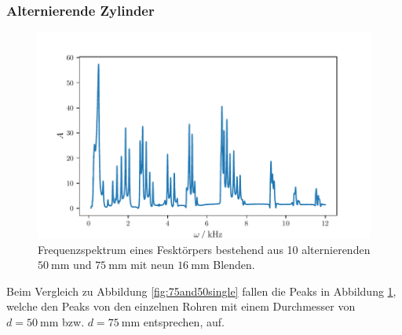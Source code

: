 \subsubsection{Alternierende Zylinder}
\begin{figure}
    \centering
    \includegraphics{build/5075.pdf}
    \caption{Frequenzspektrum eines Fesktörpers bestehend aus 10 alternierenden $\qty{50}{\milli\meter}$ und $\qty{75}{\milli\meter}$ mit neun 
    $\qty{16}{\milli\meter}$ Blenden.}
    \label{fig:5075}
\end{figure}
Beim Vergleich zu Abbildung \ref{fig:75and50single} fallen die Peaks in Abbildung \ref{fig:5075}, welche den Peaks von den einzelnen Rohren mit einem Durchmesser von 
$d = \qty{50}{\milli\meter}$ bzw. $d = \qty{75}{\milli\meter}$ entsprechen, auf. 
